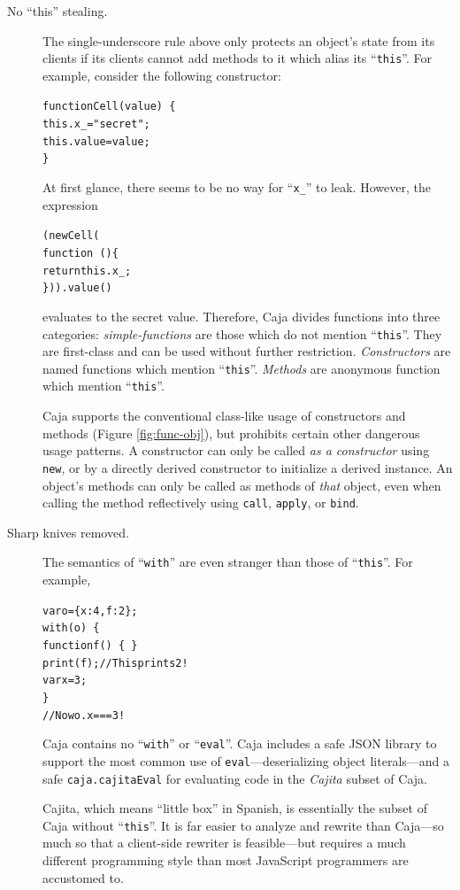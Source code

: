 \documentclass[letterpaper,twocolumn,10pt]{article}
\newcommand{\code}[1]{{\tt {#1}}}              %
\begin{document}
\begin{description}
  \item[No ``this'' stealing.]  
  The single-underscore rule above only protects 
  an object's state from its clients if its clients cannot add methods to it 
  which alias its ``\code{this}''.  For example, consider the following
  constructor:
\begin{alltt}
function Cell(value)\ \{
  this.x_ = "secret";
  this.value = value;
\}
\end{alltt}
  At first glance, there seems to be no way for ``\code{x\_}'' to leak.
  However, the expression
\begin{alltt}
(new Cell( 
    function\ ()\{ 
      return this.x_; 
    \})).value()
\end{alltt}
  evaluates to the secret value.  Therefore, Caja divides functions into three 
  categories: \emph{simple-functions} are those which do not mention 
  ``\code{this}''. They are first-class and can be used without further 
  restriction. \emph{Constructors} are named functions which mention 
  ``\code{this}''. \emph{Methods} are anonymous function which mention 
  ``\code{this}''.
  
  Caja supports the conventional class-like usage of constructors and methods 
  (Figure \ref{fig:func-obj}), but 
  prohibits certain other dangerous usage patterns. A constructor can only be 
  called \emph{as a constructor} using \code{new}, or by a directly derived 
  constructor to initialize a derived instance. An object's methods can only 
  be called as methods of \emph{that} object, even when calling the method 
  reflectively using \code{call}, \code{apply}, or \code{bind}.
 
  \item[Sharp knives removed.] The semantics of ``\code{with}'' are even
  stranger than those of ``\code{this}''.  For example,
\begin{alltt}
var o = \{ x: 4, f: 2 \};
with(o)\ \{
  function f()\ \{\ \}
  print(f); // This prints 2!
  var x = 3;
\}
// Now o.x === 3 !
\end{alltt}
   Caja contains no ``\code{with}'' or 
  ``\code{eval}''. Caja includes a safe JSON library to support the most 
  common use of \code{eval}---deserializing object literals---and a safe 
  \code{caja.cajitaEval} for evaluating code in the \emph{Cajita} subset 
  of Caja. 
  
  Cajita, which means ``little box'' in Spanish, is essentially 
  the subset of Caja without ``\code{this}''.  It is far easier to analyze
  and rewrite than Caja---so much so that a client-side rewriter is
  feasible---but requires a much different programming style than
  most JavaScript programmers are accustomed to.
 
\end{description}
\end{document}
